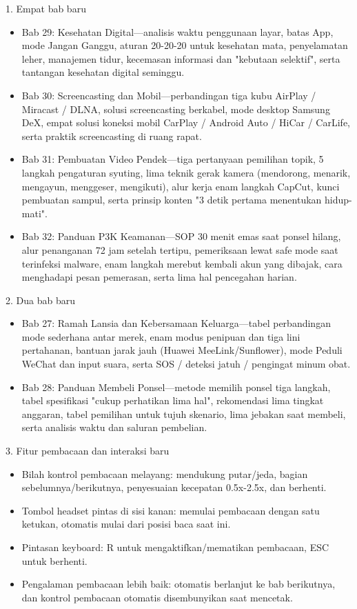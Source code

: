 
1. Empat bab baru

\begin{itemize}
  \item Bab 29: Kesehatan Digital—analisis waktu penggunaan layar, batas App, mode Jangan Ganggu, aturan 20-20-20 untuk kesehatan mata, penyelamatan leher, manajemen tidur, kecemasan informasi dan "kebutaan selektif", serta tantangan kesehatan digital seminggu.
  \item Bab 30: Screencasting dan Mobil—perbandingan tiga kubu AirPlay / Miracast / DLNA, solusi screencasting berkabel, mode desktop Samsung DeX, empat solusi koneksi mobil CarPlay / Android Auto / HiCar / CarLife, serta praktik screencasting di ruang rapat.
  \item Bab 31: Pembuatan Video Pendek—tiga pertanyaan pemilihan topik, 5 langkah pengaturan syuting, lima teknik gerak kamera (mendorong, menarik, mengayun, menggeser, mengikuti), alur kerja enam langkah CapCut, kunci pembuatan sampul, serta prinsip konten "3 detik pertama menentukan hidup-mati".
  \item Bab 32: Panduan P3K Keamanan—SOP 30 menit emas saat ponsel hilang, alur penanganan 72 jam setelah tertipu, pemeriksaan lewat safe mode saat terinfeksi malware, enam langkah merebut kembali akun yang dibajak, cara menghadapi pesan pemerasan, serta lima hal pencegahan harian.
\end{itemize}

2. Dua bab baru

\begin{itemize}
  \item Bab 27: Ramah Lansia dan Kebersamaan Keluarga—tabel perbandingan mode sederhana antar merek, enam modus penipuan dan tiga lini pertahanan, bantuan jarak jauh (Huawei MeeLink/Sunflower), mode Peduli WeChat dan input suara, serta SOS / deteksi jatuh / pengingat minum obat.
  \item Bab 28: Panduan Membeli Ponsel—metode memilih ponsel tiga langkah, tabel spesifikasi "cukup perhatikan lima hal", rekomendasi lima tingkat anggaran, tabel pemilihan untuk tujuh skenario, lima jebakan saat membeli, serta analisis waktu dan saluran pembelian.
\end{itemize}

3. Fitur pembacaan dan interaksi baru

\begin{itemize}
  \item Bilah kontrol pembacaan melayang: mendukung putar/jeda, bagian sebelumnya/berikutnya, penyesuaian kecepatan 0.5x-2.5x, dan berhenti.
  \item Tombol headset pintas di sisi kanan: memulai pembacaan dengan satu ketukan, otomatis mulai dari posisi baca saat ini.
  \item Pintasan keyboard: R untuk mengaktifkan/mematikan pembacaan, ESC untuk berhenti.
  \item Pengalaman pembacaan lebih baik: otomatis berlanjut ke bab berikutnya, dan kontrol pembacaan otomatis disembunyikan saat mencetak.
\end{itemize}

